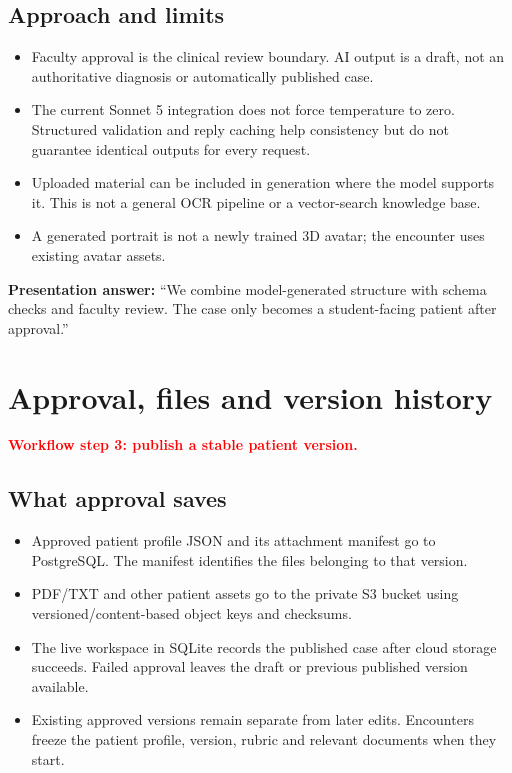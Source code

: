 \documentclass[10pt,letterpaper]{article}
\newcommand{\callout}[1]{\par\vspace{5pt}\noindent\colorbox{pale}{\parbox{\dimexpr\linewidth-2\fboxsep\relax}{\small #1}}\par\vspace{5pt}}
\newcommand{\page}[2]{\clearpage\section{#1}\textcolor{red}{\textbf{#2}}\par}
\begin{document}
\subsection*{Approach and limits}
\begin{itemize}
\item Faculty approval is the clinical review boundary. AI output is a draft, not an authoritative diagnosis or automatically published case.
\item The current Sonnet 5 integration does not force temperature to zero. Structured validation and reply caching help consistency but do not guarantee identical outputs for every request.
\item Uploaded material can be included in generation where the model supports it. This is not a general OCR pipeline or a vector-search knowledge base.
\item A generated portrait is not a newly trained 3D avatar; the encounter uses existing avatar assets.
\end{itemize}
\callout{\textbf{Presentation answer:} ``We combine model-generated structure with schema checks and faculty review. The case only becomes a student-facing patient after approval.''}

\page{Approval, files and version history}{Workflow step 3: publish a stable patient version.}
\subsection*{What approval saves}
\begin{itemize}
\item Approved patient profile JSON and its attachment manifest go to PostgreSQL. The manifest identifies the files belonging to that version.
\item PDF/TXT and other patient assets go to the private S3 bucket using versioned/content-based object keys and checksums.
\item The live workspace in SQLite records the published case after cloud storage succeeds. Failed approval leaves the draft or previous published version available.
\item Existing approved versions remain separate from later edits. Encounters freeze the patient profile, version, rubric and relevant documents when they start.
\end{itemize}
\end{document}
